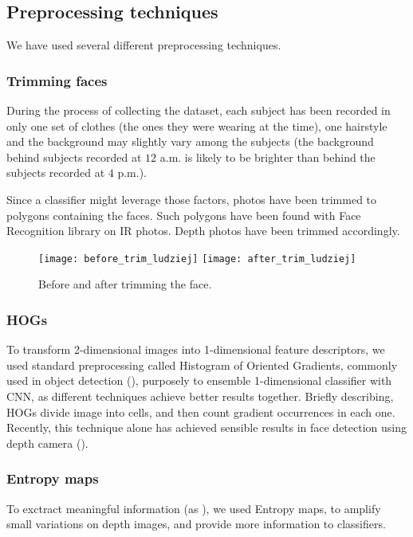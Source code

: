     \subsection{Preprocessing techniques}
    We have used several different preprocessing techniques.
        \subsubsection*{Trimming faces}
        \label{sec:trimming}
        During the process of collecting the dataset, each subject has been
        recorded in only one set of clothes (the ones they were wearing at the
        time), one hairstyle and the background may slightly vary among the
        subjects (the background behind subjects recorded at $12$ a.m. is
        likely to be brighter than behind the subjects recorded at $4$ p.m.).

        Since a classifier might leverage those factors, photos have been
        trimmed to polygons containing the faces. Such polygons have been
        found with Face Recognition library \cite{facerecog} on IR photos.
        Depth photos have been trimmed accordingly.

        \begin{figure}[H]
        \caption{Before and after trimming the face.}
        \centering
        \texttt{[image: before\_trim\_ludziej]}
        \texttt{[image: after\_trim\_ludziej]}
        \end{figure}

        \subsubsection*{HOGs}
        To transform 2-dimensional images into 1-dimensional feature descriptors,
        we used standard preprocessing called Histogram of Oriented Gradients, commonly used in
        object detection (\citeauthor{hog}), purposely to ensemble 1-dimensional classifier with CNN,
        as different techniques achieve better results together. Briefly describing,
        HOGs divide image into cells, and then count gradient occurrences in each one.
        Recently, this technique alone has achieved sensible results in face detection using depth camera (\citeauthor{rgbdhog}).

        \subsubsection*{Entropy maps}
        To exctract meaningful information (as \citeauthor{rgbdhog}),
        we used Entropy maps, to amplify small variations on depth images, and provide
        more information to classifiers.

